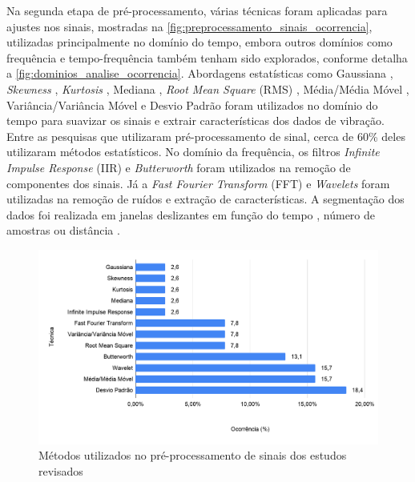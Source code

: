Na segunda etapa de pré-processamento, várias técnicas foram aplicadas para ajustes nos sinais, mostradas na \autoref{fig:preprocessamento_sinais_ocorrencia}, utilizadas principalmente no domínio do tempo, embora outros domínios como frequência e tempo-frequência também tenham sido explorados, conforme detalha a \autoref{fig:dominios_analise_ocorrencia}. Abordagens estatísticas como Gaussiana \cite{Pooja2017}, \textit{Skewness} \cite{Alqudah2016}, \textit{Kurtosis} \cite{Alqudah2016}, Mediana \cite{Alqudah2016,Li2016}, \textit{Root Mean Square} (RMS) \cite{Jang2015,Li2018,Sharma2015}, Média/Média Móvel \cite{Alqudah2016,Andria2016,Bose2018,Li2016, Pholprasit2015,Savera2016,Singh2017}, Variância/Variância Móvel \cite{Alqudah2016,Andria2016} e Desvio Padrão \cite{Andria2016,BelloSalau2018,Hou2017,Lima2016,Pholprasit2015,Prapulla2017} foram utilizados no domínio do tempo para suavizar os sinais e extrair características dos dados de vibração. Entre as pesquisas que utilizaram pré-processamento de sinal, cerca de 60\% deles utilizaram métodos estatísticos. No domínio da frequência, os filtros \textit{Infinite Impulse Response} (IIR) \cite{Wu2018} e \textit{Butterworth} \cite{Hou2017,Niskanen2015,Pitonak2016,Souza2018,Wu2013} foram utilizados na remoção de componentes dos sinais. Já a \textit{Fast Fourier Transform} (FFT) \cite{Allouch2017,Douangphachanh2013,Douangphachanh2014} e \textit{Wavelets} \cite{BelloSalau2018,Eftekhari2018,El-Wakeel2018,Gueta2017,Singh2017,Wang2018} foram utilizadas na remoção de ruídos e extração de características. A segmentação dos dados foi realizada em janelas deslizantes em função do tempo \cite{Wang2018}, número de amostras \cite{Singh2017} ou distância \cite{Li2018}. 

\begin{figure}[h!]
  \centering
  \caption{Métodos utilizados no pré-processamento de sinais dos estudos revisados}
   \label{fig:preprocessamento_sinais_ocorrencia}
   \includegraphics[width=1\textwidth]{figuras/fig_17.png}
\end{figure}

